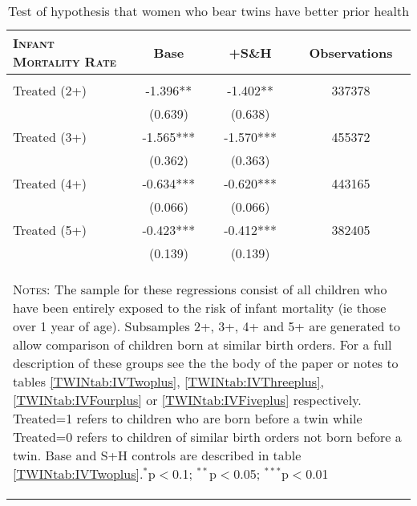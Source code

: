 \begin{table}[htpb!]
\caption{Test of hypothesis that women who bear twins have better prior health}\label{TWINtab:IMR}\begin{center}\begin{tabular}{lccc}
\toprule \toprule 
\textsc{Infant Mortality Rate}& Base & +S\&H & Observations \\ \midrule 
\begin{footnotesize}\end{footnotesize}& 
\begin{footnotesize}\end{footnotesize}& 
\begin{footnotesize}\end{footnotesize}& 
\begin{footnotesize}\end{footnotesize}\\ 
Treated (2+)\hspace{5mm}\hspace{5mm}\hspace{5mm}\hspace{5mm}\hspace{5mm}\hspace{5mm}&-1.396**&-1.402**&337378\\
&(0.639)&(0.638)&\\
Treated (3+)\hspace{5mm}&-1.565***&-1.570***&455372\\
&(0.362)&(0.363)&\\
Treated (4+)&-0.634***&-0.620***&443165\\
&(0.066)&(0.066)&\\
Treated (5+)&-0.423***&-0.412***&382405\\
&(0.139)&(0.139)&\\
\midrule\multicolumn{4}{p{10.6cm}}{\begin{footnotesize}\textsc{Notes:} The sample for these regressions consist of all children who have been entirely exposed to the risk of infant mortality (ie those over 1 year of age). Subsamples 2+, 3+, 4+ and 5+ are generated to allow comparison of children born at similar birth orders.  For a full description of these groups see the the body of the paper or notes to tables \ref{TWINtab:IVTwoplus}, \ref{TWINtab:IVThreeplus}, \ref{TWINtab:IVFourplus} or \ref{TWINtab:IVFiveplus} respectively. Treated=1 refers to children who are born before a twin while Treated=0 refers to children of similar birth orders not born before a twin.  Base and S+H controls are described in table \ref{TWINtab:IVTwoplus}.$^{*}$p$<$0.1; $^{**}$p$<$0.05; $^{***}$p$<$0.01 
\end{footnotesize}} \\ \bottomrule 
\end{tabular}\end{center}\end{table}